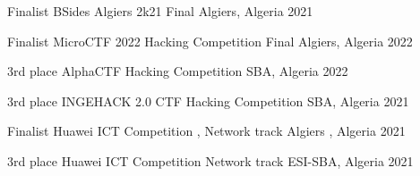



\begin{cvhonors}

  \cvhonor
    {Finalist} %
    {BSides Algiers 2k21 Final} %
    {Algiers, Algeria} %
    {2021} %

  \cvhonor
    {Finalist} %
    {MicroCTF 2022 Hacking Competition  Final} %
    {Algiers, Algeria} %
    {2022} %

  \cvhonor
    {3rd place} %
    {AlphaCTF Hacking Competition} %
    {SBA, Algeria} %
    {2022} %

  \cvhonor
    {3rd place} %
    {INGEHACK 2.0 CTF Hacking Competition } %
    {SBA, Algeria} %
    {2021} %
    
    
\end{cvhonors}



\begin{cvhonors}


 \cvhonor
    {Finalist} %
    {Huawei ICT Competition , Network track } %
    {Algiers , Algeria} %
    {2021} %

 \cvhonor
    {3rd place} %
    {Huawei ICT Competition Network track } %
    {ESI-SBA, Algeria} %
    {2021} %


\end{cvhonors}


